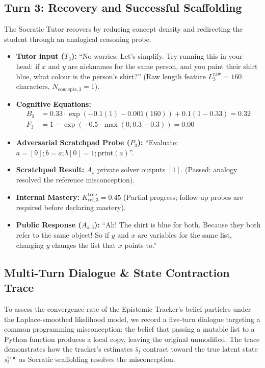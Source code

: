 \documentclass[11pt,a4paper]{report}
\begin{document}
\subsection{Turn 3: Recovery and Successful Scaffolding}
The Socratic Tutor recovers by reducing concept density and redirecting the student through an analogical reasoning probe.
\begin{itemize}
    \item \textbf{Tutor input ($T_3$):} ``No worries. Let's simplify. Try running this in your head: if $x$ and $y$ are nicknames for the same person, and you paint their shirt blue, what colour is the person's shirt?'' (Raw length feature $L^{\text{raw}}_3 = 160$ characters, $N_{\text{concepts},3} = 1$).
    \item \textbf{Cognitive Equations:}
    \begin{align*}
        B_3 &= 0.33 \cdot \exp\left(-0.1(1) - 0.001(160)\right) + 0.1(1 - 0.33) = 0.32 \\
        F_3 &= 1 - \exp\left(-0.5 \cdot \max(0, 0.3 - 0.3)\right) = 0.00
    \end{align*}
    \item \textbf{Adversarial Scratchpad Probe ($P_3$):} ``Evaluate: $a = [9]; b = a; b[0] = 1; \text{print}(a)$''.
    \item \textbf{Scratchpad Result:} $A_s$ private solver outputs $[1]$. (Passed: analogy resolved the reference misconception).
    \item \textbf{Internal Mastery:} $K^{\text{true}}_{\text{ref}, 3} = 0.45$ (Partial progress; follow-up probes are required before declaring mastery).
    \item \textbf{Public Response ($A_{s,3}$):} ``Ah! The shirt is blue for both. Because they both refer to the same object! So if $y$ and $x$ are variables for the same list, changing $y$ changes the list that $x$ points to.''
\end{itemize}

\subsection{Multi-Turn Dialogue \& State Contraction Trace}
To assess the convergence rate of the Epistemic Tracker's belief particles under the Laplace-smoothed likelihood model, we record a five-turn dialogue targeting a common programming misconception: the belief that passing a mutable list to a Python function produces a local copy, leaving the original unmodified. The trace demonstrates how the tracker's estimates $\hat{s}_t$ contract toward the true latent state $s_t^{\text{true}}$ as Socratic scaffolding resolves the misconception.
\end{document}
